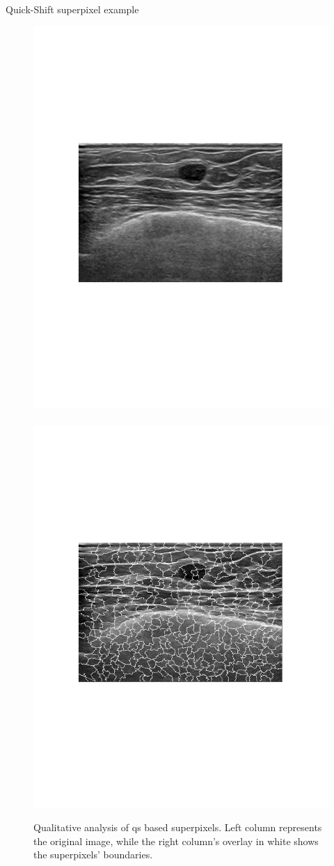 \begin{frame}{Quick-Shift superpixel example}
\begin{figure}[Htbp]
\centering
\includegraphics[trim = 95 300 100 242, clip,width=.48\textwidth]{quickShift/6a.pdf}\,
\includegraphics[trim = 95 300 100 242, clip,width=.48\textwidth]{quickShift/6b.pdf}
\caption{Qualitative analysis of \acf{qs} based superpixels. Left column represents the original image, while the right column's overlay in white shows the superpixels' boundaries.}
\label{fig:quickShiftBUS}
\end{figure}
\end{frame}


